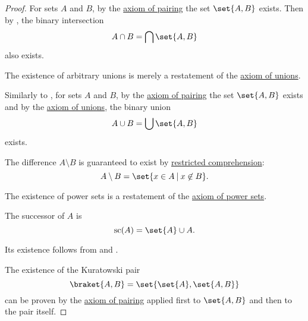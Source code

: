 \begin{proof}
   For sets \( A \) and \( B \), by the \hyperref[def:zfc/pairing]{axiom of pairing} the set \( \set{ A, B } \) exists. Then by , the binary intersection
  \begin{equation*}
    A \cap B = \bigcap \set{ A, B }
  \end{equation*}
  also exists.

   The existence of arbitrary unions is merely a restatement of the \hyperref[def:zfc/union]{axiom of unions}.

   Similarly to , for sets \( A \) and \( B \), by the \hyperref[def:zfc/pairing]{axiom of pairing} the set \( \set{ A, B } \) exists and by the \hyperref[def:zfc/union]{axiom of unions}, the binary union
  \begin{equation*}
    A \cup B = \bigcup \set{ A, B }
  \end{equation*}
  exists.

   The difference \( A \setminus B \) is guaranteed to exist by \hyperref[def:zfc/specification]{restricted comprehension}:
  \begin{equation*}
    A \setminus B = \set{ x \in A \given x \not\in B }.
  \end{equation*}

   The existence of power sets is a restatement of the \hyperref[def:zfc/power_set]{axiom of power sets}.

   The successor of \( A \) is
  \begin{equation*}
    \op{sc}(A) = \set{ A } \cup A.
  \end{equation*}

  Its existence follows from  and .

   The existence of the Kuratowski pair
  \begin{equation*}
    \braket{ A, B } = \set{ \set{ A }, \set{ A, B } }
  \end{equation*}
  can be proven by the \hyperref[def:zfc/pairing]{axiom of pairing} applied first to \( \set{ A, B } \) and then to the pair itself.


\end{proof}
